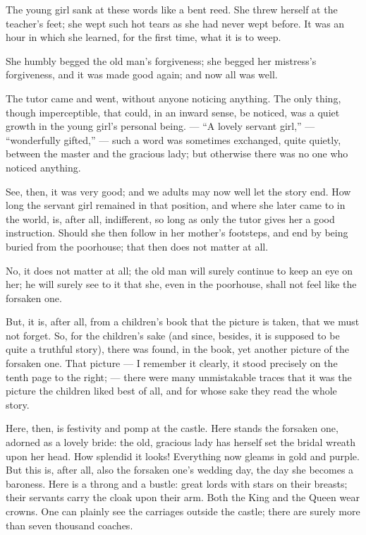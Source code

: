 \documentclass[12pt,a4paper]{book}
\begin{document}
The young girl sank at these words like a bent reed. She threw herself at the teacher's feet; she wept such hot tears as she had never wept before. It was an hour in which she learned, for the first time, what it is to weep.

She humbly begged the old man's forgiveness; she begged her mistress's forgiveness, and it was made good again; and now all was well.

The tutor came and went, without anyone noticing anything. The only thing, though imperceptible, that could, in an inward sense, be noticed, was a quiet growth in the young girl's personal being. --- ``A lovely servant girl,'' --- ``wonderfully gifted,'' --- such a word was sometimes exchanged, quite quietly, between the master and the gracious lady; but otherwise there was no one who noticed anything.

See, then, it was very good; and we adults may now well let the story end. How long the servant girl remained in that position, and where she later came to in the world, is, after all, indifferent, so long as only the tutor gives her a good instruction. Should she then follow in her mother's footsteps, and end
by being buried from the poorhouse; that then does not matter at all.

No, it does not matter at all; the old man will surely continue to keep an eye on her; he will surely see to it that she, even in the poorhouse, shall not feel like the forsaken one.

But, it is, after all, from a children's book that the picture is taken, that we must not forget. So, for the children's sake (and since, besides, it is supposed to be quite a truthful story), there was found, in the book, yet another picture of the forsaken one. That picture --- I remember it clearly, it stood precisely on the tenth page to the right; --- there were many unmistakable traces that it was the picture the children liked best of all, and for whose sake they read the whole story.

Here, then, is festivity and pomp at the castle. Here stands the forsaken one, adorned as a lovely bride: the old, gracious lady has herself set the bridal wreath upon her head. How splendid it looks! Everything now gleams in gold and purple. But this is, after all, also the forsaken one's wedding day, the day she becomes a baroness. Here is a throng and a bustle: great lords with stars on their breasts; their servants carry the cloak upon their arm. Both the King and the Queen wear crowns. One can plainly see the carriages outside the castle; there are surely more than seven thousand coaches.
\end{document}
